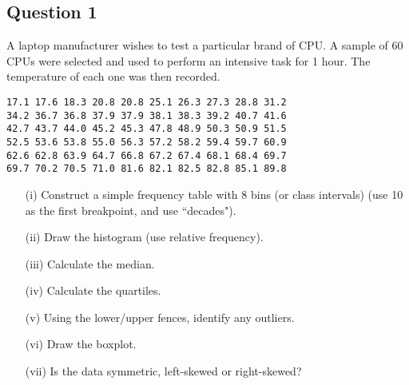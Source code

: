 \subsection*{Question 1}
A laptop manufacturer wishes to test a particular brand of CPU. A sample of 60 CPUs were selected and used to perform an intensive task for 1 hour. The temperature of each one was then recorded.
\begin{center}
{
\begin{framed}
\large
\begin{verbatim}
17.1 17.6 18.3 20.8 20.8 25.1 26.3 27.3 28.8 31.2
34.2 36.7 36.8 37.9 37.9 38.1 38.3 39.2 40.7 41.6
42.7 43.7 44.0 45.2 45.3 47.8 48.9 50.3 50.9 51.5
52.5 53.6 53.8 55.0 56.3 57.2 58.2 59.4 59.7 60.9
62.6 62.8 63.9 64.7 66.8 67.2 67.4 68.1 68.4 69.7
69.7 70.2 70.5 71.0 81.6 82.1 82.5 82.8 85.1 89.8
\end{verbatim}
\end{framed}
}
\end{center}

\begin{itemize}
\item[(i)] Construct a simple frequency table with 8 bins (or class intervals) (use 10 as the first breakpoint, and use ``decades"). 
\item[(ii)] Draw the histogram (use relative frequency). 
\item[(iii)] Calculate the median. 
\item[(iv)] Calculate the quartiles. 
\item[(v)] Using the lower/upper fences, identify any outliers. 
\item[(vi)] Draw the boxplot. 
\item[(vii)] Is the data symmetric, left-skewed or right-skewed?
\end{itemize}


